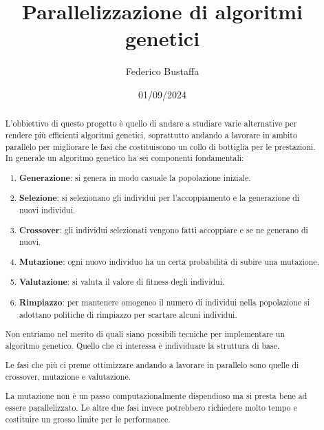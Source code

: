 \documentclass[12pt]{article}
\title{Parallelizzazione di algoritmi genetici}
\author{Federico Bustaffa}
\date{01/09/2024}
\begin{document}
\maketitle

\begin{abstract}
	L'obbiettivo di questo progetto è quello di andare a studiare varie alternative
	per rendere più efficienti algoritmi genetici, soprattutto andando a lavorare
	in ambito parallelo per migliorare le fasi che costituiscono un collo di
	bottiglia per le prestazioni. In generale un algoritmo genetico ha sei
	componenti fondamentali:
	\begin{enumerate}
		\item \textbf{Generazione}: si genera in modo casuale la popolazione
		      iniziale.
		\item \textbf{Selezione}: si selezionano gli individui per l'accoppiamento
		      e la generazione di nuovi individui.
		\item \textbf{Crossover}: gli individui selezionati vengono fatti
		      accoppiare e se ne generano di nuovi.
		\item \textbf{Mutazione}: ogni nuovo individuo ha un certa probabilità di
		      subire una mutazione.
		\item \textbf{Valutazione}: si valuta il valore di fitness degli individui.
		\item \textbf{Rimpiazzo}: per mantenere omogeneo il numero di individui
		      nella popolazione si adottano politiche di rimpiazzo per scartare
		      alcuni individui.
	\end{enumerate}
	Non entriamo nel merito di quali siano possibili tecniche per implementare un
	algoritmo genetico. Quello che ci interessa è individuare la struttura di base.

	Le fasi che più ci preme ottimizzare andando a lavorare in parallelo sono
	quelle di crossover, mutazione e valutazione.

	La mutazione non è un passo computazionalmente dispendioso ma si presta bene ad
	essere parallelizzato. Le altre due fasi invece potrebbero richiedere molto
	tempo e costituire un grosso limite per le performance.
\end{abstract}

\tableofcontents


\end{document}
